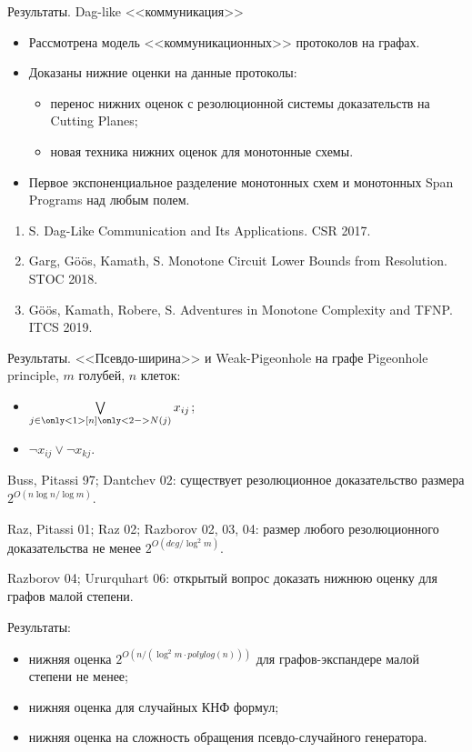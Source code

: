 \begin{frame}{Результаты. Dag-like <<коммуникация>>}
    \begin{itemize}
        \pause    
        \item Рассмотрена модель <<коммуникационных>> протоколов на графах.
        \pause
        \item Доказаны нижние оценки на данные протоколы:
            \begin{itemize}
                \item перенос нижних оценок с резолюционной системы доказательств на Cutting Planes;
                \item новая техника нижних оценок для монотонные схемы.
            \end{itemize}
        \pause
        \item Первое экспоненциальное разделение монотонных схем и монотонных Span Programs над любым
            полем.
    \end{itemize}

    \pause

    \begin{enumerate}
        \item S. Dag-Like Communication and Its Applications. CSR 2017.
        \item Garg, G\"{o}\"{o}s, Kamath, S. Monotone Circuit Lower Bounds from Resolution. STOC 2018.
        \item G\"{o}\"{o}s, Kamath, Robere, S. Adventures in Monotone Complexity and TFNP. ITCS 2019.
    \end{enumerate}
\end{frame}

\begin{frame}{Результаты. <<Псевдо-ширина>> и Weak-Pigeonhole на графе}
    Pigeonhole principle, $m$ голубей, $n$ клеток:
    \begin{itemize}
        \item $\bigvee\limits_{j \in \only<1>{[n]} \only<2->{N(j)}} x_{ij}$;
        \item $\neg x_{ij} \lor \neg x_{kj}$.
    \end{itemize}

    \pause
    \pause
    Buss, Pitassi 97; Dantchev 02: существует резолюционное доказательство размера
    $2^{O(n \log n / \log m)}$.

    \pause
    Raz, Pitassi 01; Raz 02; Razborov 02, 03, 04: размер любого резолюционного доказательства не менее $2^{O(deg / \log^2 m)}$.

    \pause
    Razborov 04; Ururquhart 06: открытый вопрос доказать нижнюю оценку для графов малой степени.

    \pause
    Результаты:
    \begin{itemize}
        \item нижняя оценка $2^{O(n / (\log^2 m \cdot polylog(n)))}$ для графов-экспандере малой степени не менее;
        \item нижняя оценка для случайных КНФ формул;
        \item нижняя оценка на сложность обращения псевдо-случайного генератора.
    \end{itemize}
\end{frame}


